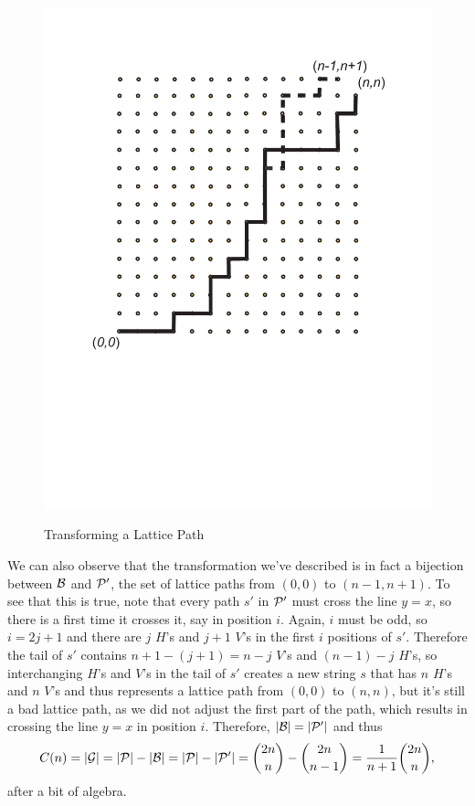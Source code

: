 \begin{example}
\begin{figure}
\begin{center}
\includegraphics[viewport=69 240 550 714,scale=.4]{string-figs/3012-fig26}\\
\caption{Transforming a Lattice Path}
\label{flippath}
\end{center}
\end{figure}

We can also observe that the transformation we've described is in fact
a bijection between $\mathcal{B}$ and $\mathcal{P}'$, the set of lattice paths from
$(0,0)$ to $(n-1,n+1)$. To see that this is true, note that every path
$s'$ in $\mathcal{P}'$ must cross the line $y=x$, so there is a first time it
crosses it, say in position $i$. Again, $i$ must be odd, so $i=2j+1$
and there are $j$ $H$'s and $j+1$ $V$'s in the first $i$ positions of
$s'$. Therefore the tail of $s'$ contains $n+1-(j+1)=n-j$ $V$'s and
$(n-1)-j$ $H$'s, so interchanging $H$'s and $V$'s in the tail of $s'$
creates a new string $s$ that has $n$ $H$'s and $n$ $V$'s and thus
represents a lattice path from $(0,0)$ to $(n,n)$, but it's still a
bad lattice path, as we did not adjust the first part of the path,
which results in crossing the line $y=x$ in position $i$. Therefore,
$|\mathcal{B}|=|\mathcal{P}'|$ and thus
\[C(n)=|\mathcal{G}|=|\mathcal{P}|-|\mathcal{B}|=|\mathcal{P}|-|\mathcal{P}'| = \binom{2n}{n} -
\binom{2n}{n-1} = \frac{1}{n+1}\binom{2n}{n},\]
after a bit of algebra.
\end{example}

